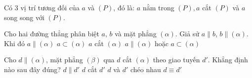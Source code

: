 \begin{ex}
{\begin{center}
\begin{minipage}[tcb]{.3\textwidth}
            \end{minipage}
        \end{center}
        Có 3 vị trí tương đối của $a$ và $(P)$, đó là:
        $a$ nằm trong $(P), a$ cắt $(P)$ và $a$ song song với $(P)$.
    }
\end{ex}
\begin{ex}%
    Cho hai đường thẳng phân biệt $a$, $b$ và mặt phẳng $(\alpha)$. Giả sử $a\parallel b$, $b\parallel (\alpha)$. Khi đó
    \choice
    {$a \parallel (\alpha)$}
    {$a \subset (\alpha)$}
    {$a$ cắt $(\alpha)$}
    {\True $a \parallel (\alpha)$ hoặc $a \subset(\alpha)$}
\end{ex}
\begin{ex}%
    Cho $d \parallel (\alpha)$, mặt phẳng $(\beta)$ qua $d$ cắt $(\alpha)$ theo giao tuyến $d'$. Khẳng định nào sau đây đúng?
    \choice
    {\True $d \parallel d'$}
    {$d$ cắt $d'$}
    {$d$ và $d'$ chéo nhau}
    {$d \equiv d'$}
\end{ex}
